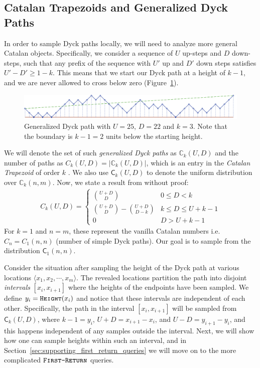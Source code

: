 \subsection{Catalan Trapezoids and Generalized Dyck Paths}
In order to sample Dyck paths locally, we will need to analyze more general Catalan objects.
Specifically, we consider a sequence of $U$ up-steps and $D$ down-steps,
such that any prefix of the sequence with $U'$ up and $D'$ down steps satisfies $U'-D' \ge 1-k$.
This means that we start our Dyck path at a height of $k-1$, and we are never allowed to cross below zero (Figure~\ref{fig:complex_dyck}).
\begin{figure}[htbp]
    \centering
    \includegraphics[width=\textwidth]{images/complex_dyck_path.pdf}
    \caption{Generalized Dyck path with $U = 25$, $D = 22$ and $k = 3$.
             Note that the boundary is $k-1 = 2$ units below the starting height.} \label{fig:complex_dyck}
\end{figure}

We will denote the set of such \emph{generalized Dyck paths} as $\mathbb C_k(U,D)$ and the number of paths as $C_k(U,D) = |\mathbb C_k(U,D)|$,
which is an entry in the \textit{Catalan Trapezoid} of order $k$ \cite{trap}.
We also use $\mathsf C_k(U,D)$ to denote the uniform distribution over $\mathbb C_k(n,m)$.
Now, we state a result from \cite{trap} without proof:
\begin{align}
    \label{eq:catalan_trapezoid}
    C_k(U,D)=
    \begin{cases}
    \binom{U+D}{D} &0\le D<k\\
    \binom{U+D}{D} - \binom{U+D}{D-k} &k\le D\le U+k-1\\
    0 &D>U+k-1
    \end{cases}
\end{align}
For $k = 1$ and $n=m$, these represent the vanilla Catalan numbers i.e. $C_n = C_1(n,n)$ (number of simple Dyck paths).
Our goal is to sample from the distribution $\mathsf C_1(n,n)$.

Consider the situation after sampling the height of the Dyck path at various locations $\langle x_1, x_2,\cdots, x_m \rangle$.
The revealed locations partition the path into disjoint \emph{intervals} $[x_i,x_{i+1}]$ where the heights of the endpoints have been sampled.
We define $y_i = \texttt{\textsc{Height}}(x_i)$ and notice that these intervals are independent of each other.
Specifically, the path in the interval $[x_i, x_{i+1}]$ will be sampled from $\mathsf C_k(U,D)$,
where $k - 1 = y_i$, $U + D = x_{i+1} - x_i$, and $U-D = y_{i+1} - y_i$, and this happens independent of any samples outside the interval.
Next, we will show how one can sample heights within such an interval,
and in Section~\ref{sec:supporting_first_return_queries} we will move on to the more complicated $\texttt{\textsc{First-Return}}$ queries.

